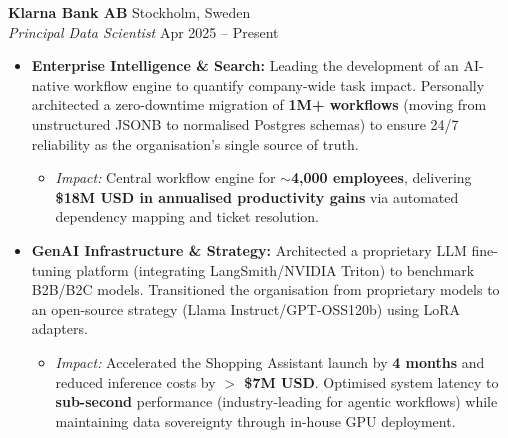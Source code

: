 \documentclass[11pt,a4paper]{article}
\begin{document}
\noindent \textbf{Klarna Bank AB} \hfill Stockholm, Sweden \\
\textit{Principal Data Scientist} \hfill Apr 2025 -- Present
\begin{itemize}[leftmargin=*, label=\textbullet]
    \item \textbf{Enterprise Intelligence \& Search:} Leading the development of an AI-native workflow engine to quantify company-wide task impact. Personally architected a zero-downtime migration of \textbf{1M+ workflows} (moving from unstructured JSONB to normalised Postgres schemas) to ensure 24/7 reliability as the organisation's single source of truth.
    \begin{itemize}[label=$\circ$]
    \item \textit{Impact:} Central workflow engine for \textbf{$\sim$4,000 employees}, delivering \textbf{\$18M USD in annualised productivity gains} via automated dependency mapping and ticket resolution.
\end{itemize}
    \smallskip
    \item \textbf{GenAI Infrastructure \& Strategy:} Architected a proprietary LLM fine-tuning platform (integrating LangSmith/NVIDIA Triton) to benchmark B2B/B2C models. Transitioned the organisation from proprietary models to an open-source strategy (Llama Instruct/GPT-OSS120b) using LoRA adapters.
    \begin{itemize}[label=$\circ$]
        \item \textit{Impact:} Accelerated the Shopping Assistant launch by \textbf{4 months} and reduced inference costs by \textbf{$>$ \$7M USD}. Optimised system latency to \textbf{sub-second} performance (industry-leading for agentic workflows) while maintaining data sovereignty through in-house GPU deployment.
    \end{itemize}
\end{itemize}

\vspace{0.5em}
\end{document}
